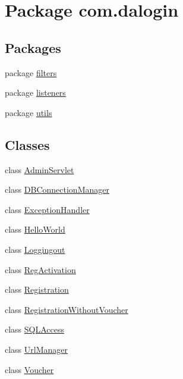 \hypertarget{namespacecom_1_1dalogin}{}\section{Package com.\+dalogin}
\label{namespacecom_1_1dalogin}
\subsection*{Packages}
\begin{DoxyCompactItemize}
\item 
package \hyperlink{namespacecom_1_1dalogin_1_1filters}{filters}
\item 
package \hyperlink{namespacecom_1_1dalogin_1_1listeners}{listeners}
\item 
package \hyperlink{namespacecom_1_1dalogin_1_1utils}{utils}
\end{DoxyCompactItemize}
\subsection*{Classes}
\begin{DoxyCompactItemize}
\item 
class \hyperlink{classcom_1_1dalogin_1_1_admin_servlet}{Admin\+Servlet}
\item 
class \hyperlink{classcom_1_1dalogin_1_1_d_b_connection_manager}{D\+B\+Connection\+Manager}
\item 
class \hyperlink{classcom_1_1dalogin_1_1_exception_handler}{Exception\+Handler}
\item 
class \hyperlink{classcom_1_1dalogin_1_1_hello_world}{Hello\+World}
\item 
class \hyperlink{classcom_1_1dalogin_1_1_loggingout}{Loggingout}
\item 
class \hyperlink{classcom_1_1dalogin_1_1_reg_activation}{Reg\+Activation}
\item 
class \hyperlink{classcom_1_1dalogin_1_1_registration}{Registration}
\item 
class \hyperlink{classcom_1_1dalogin_1_1_registration_without_voucher}{Registration\+Without\+Voucher}
\item 
class \hyperlink{classcom_1_1dalogin_1_1_s_q_l_access}{S\+Q\+L\+Access}
\item 
class \hyperlink{classcom_1_1dalogin_1_1_url_manager}{Url\+Manager}
\item 
class \hyperlink{classcom_1_1dalogin_1_1_voucher}{Voucher}
\end{DoxyCompactItemize}
